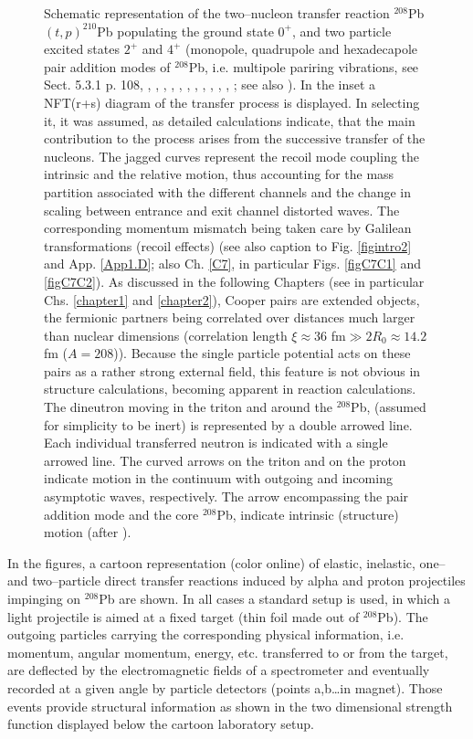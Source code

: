 \begin{figure}
\caption{Schematic representation of the two--nucleon transfer reaction $^{208}$Pb$(t,p)^{210}$Pb populating the ground state $0^+$, and two particle excited states $2^+$ and $4^+$ (monopole, quadrupole and hexadecapole pair addition modes of $^{208}$Pb, i.e. multipole pariring vibrations, see \cite{Brink:05} Sect. 5.3.1 p. 108, \cite{Broglia:74}, \cite{Ragnarsson:76}, \cite{Broglia:71b}, \cite{Broglia:71c}, \cite{Bes:71d}, \cite{Bes:71}, \cite{Flynn:71}, \cite{Bes:72}, \cite{Broglia:81c}, \cite{Bohr:74b}, \cite{Flynn:72}, \cite{Bortignon:76}; see also \cite{Kubo:70}). In the inset a NFT(r+s) diagram of the transfer process is displayed. In selecting it, it was  assumed, as detailed calculations indicate, that the main contribution to the process arises from the successive transfer of the nucleons. The jagged curves represent the recoil  mode coupling the intrinsic and the relative motion,  thus accounting for the mass partition associated with the different channels and the change in scaling between entrance and exit channel distorted waves. The corresponding momentum mismatch being taken care by Galilean transformations (recoil effects) (see also caption to Fig. \ref{figintro2} and App. \ref{App1.D}; also Ch. \ref{C7}, in particular Figs. \ref{figC7C1} and \ref{figC7C2}). As discussed in the following Chapters (see in particular Chs. \ref{chapter1} and \ref{chapter2}), Cooper pairs are extended objects, the fermionic partners being correlated over distances much larger than nuclear dimensions (correlation length $\xi\approx36$ fm$\gg 2R_0\approx 14.2$ fm ($A=208$)). Because the single particle potential acts on these pairs as a rather strong external field, this feature is not obvious in structure calculations, becoming apparent in reaction calculations. The dineutron moving in the triton and around the $^{208}$Pb, (assumed for simplicity to be inert) is represented by a double arrowed line. Each individual transferred neutron is indicated with a single arrowed line. The curved arrows on the triton and on the proton indicate motion in the continuum with outgoing and incoming asymptotic waves, respectively. The arrow encompassing the pair addition mode and the core $^{208}$Pb, indicate intrinsic (structure) motion (after \cite{Mottelson:76b}).}
\label{figintro3}
\end{figure}

In the figures, a cartoon representation (color online) of elastic, inelastic, one-- and two--particle direct transfer reactions induced by alpha and proton projectiles impinging on $^{208}$Pb are shown. In all cases a standard setup is used, in which a light projectile is aimed at a fixed target (thin foil made out of $^{208}$Pb). The outgoing particles carrying the corresponding physical information, i.e. momentum, angular momentum, energy, etc. transferred to or from the target, are deflected by the electromagnetic fields of a spectrometer and eventually recorded at a given angle by particle detectors (points a,b\dots in magnet). Those events provide structural information as shown in the two dimensional strength function displayed below the cartoon laboratory setup. 

